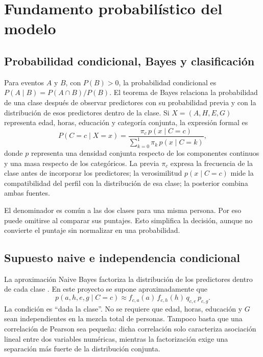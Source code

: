 \documentclass[11pt,a4paper]{article}
\begin{document}
\section{Fundamento probabilístico del modelo}
\subsection{Probabilidad condicional, Bayes y clasificación}
Para eventos $A$ y $B$, con $P(B)>0$, la probabilidad condicional es $P(A\mid B)=P(A\cap B)/P(B)$. El teorema de Bayes relaciona la probabilidad de una clase después de observar predictores con su probabilidad previa y con la distribución de esos predictores dentro de la clase. Si $X=(A,H,E,G)$ representa edad, horas, educación y categoría conjunta, la expresión formal es
\begin{equation}
P(C=c\mid X=x)=\frac{\pi_c\,p(x\mid C=c)}{\sum_{k=0}^1\pi_k\,p(x\mid C=k)},
\end{equation}
donde $p$ representa una densidad conjunta respecto de los componentes continuos y una masa respecto de los categóricos. La previa $\pi_c$ expresa la frecuencia de la clase antes de incorporar los predictores; la verosimilitud $p(x\mid C=c)$ mide la compatibilidad del perfil con la distribución de esa clase; la posterior combina ambas fuentes.

El denominador es común a las dos clases para una misma persona. Por eso puede omitirse al comparar sus puntajes. Esto simplifica la decisión, aunque no convierte el puntaje sin normalizar en una probabilidad.

\subsection{Supuesto naive e independencia condicional}
La aproximación Naive Bayes factoriza la distribución de los predictores dentro de cada clase \cite{nb}. En este proyecto se supone aproximadamente que
\begin{equation}\label{eq:factorizacion}
p(a,h,e,g\mid C=c)\approx f_{c,a}(a)\,f_{c,h}(h)\,q_{c,e}\,p_{c,g}.
\end{equation}
La condición es ``dada la clase''. No se requiere que edad, horas, educación y $G$ sean independientes en la mezcla total de personas. Tampoco basta que una correlación de Pearson sea pequeña: dicha correlación solo caracteriza asociación lineal entre dos variables numéricas, mientras la factorización exige una separación más fuerte de la distribución conjunta.
\end{document}
